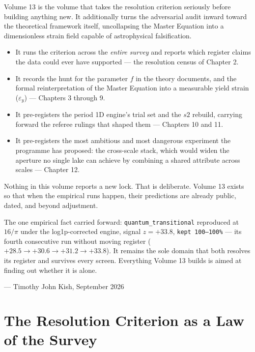 \documentclass[11pt, letterpaper, openany]{book}
\begin{document}
Volume 13 is the volume that takes the resolution criterion seriously before building anything
new. It additionally turns the adversarial audit inward toward the theoretical framework itself, uncollapsing the Master Equation into a dimensionless strain field capable of astrophysical falsification.

\begin{itemize}
    \item It runs the criterion across the \emph{entire survey} and reports which register claims the data could ever have supported --- the resolution census of Chapter 2.
    \item It records the hunt for the parameter $f$ in the theory documents, and the formal reinterpretation of the Master Equation into a measurable yield strain ($\varepsilon_y$) --- Chapters 3 through 9.
    \item It pre-registers the period 1D engine's trial set and the $s2$ rebuild, carrying forward the referee rulings that shaped them --- Chapters 10 and 11.
    \item It pre-registers the most ambitious and most dangerous experiment the programme has proposed: the cross-scale stack, which would widen the aperture no single lake can achieve by combining a shared attribute across scales --- Chapter 12.
\end{itemize}

Nothing in this volume reports a new lock. That is deliberate. Volume 13 exists so that when the empirical runs happen, their predictions are already public, dated, and beyond adjustment.

\begin{signalbox}
The one empirical fact carried forward: \texttt{quantum\_transitional} reproduced at $16/\pi$
under the log1p-corrected engine, signal $z = +33.8$, \texttt{kept 100--100\%} --- its fourth
consecutive run without moving register ($+28.5 \to +30.6 \to +31.2 \to +33.8$). It remains the
sole domain that both resolves its register and survives every screen. Everything Volume 13
builds is aimed at finding out whether it is alone.
\end{signalbox}

\vspace{1em}
\noindent\hfill --- Timothy John Kish, September 2026

\chapter{The Resolution Criterion as a Law of the Survey}
\end{document}
